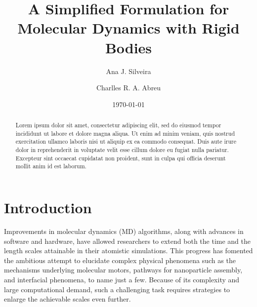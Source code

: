 \documentclass[aip,jcp,reprint,amsmath,amssymb,raggedbottom]{revtex4-1}
\begin{document}
\title{A Simplified Formulation for Molecular Dynamics with Rigid Bodies}

\author{Ana J. Silveira}

\author{Charlles R. A. Abreu}

\date{\today}

\begin{abstract}
Lorem ipsum dolor sit amet, consectetur adipiscing elit, sed do eiusmod tempor incididunt ut labore et dolore magna aliqua. Ut enim ad minim veniam, quis nostrud exercitation ullamco laboris nisi ut aliquip ex ea commodo consequat. Duis aute irure dolor in reprehenderit in voluptate velit esse cillum dolore eu fugiat nulla pariatur. Excepteur sint occaecat cupidatat non proident, sunt in culpa qui officia deserunt mollit anim id est laborum.
\end{abstract}

\maketitle

\section{Introduction}

Improvements in molecular dynamics (MD) algorithms, along with advances in software and hardware, have allowed researchers to extend both the time and the length scales attainable in their atomistic simulations. This progress has fomented the ambitious attempt to elucidate complex physical phenomena such as the mechanisms underlying molecular motors, pathways for nanoparticle assembly, and interfacial phenomena, to name just a few. Because of its complexity and large computational demand, such a challenging task requires strategies to enlarge the achievable scales even further.
\end{document}
